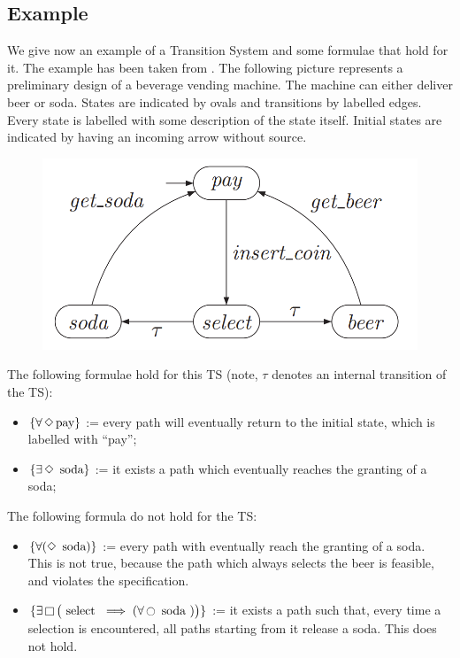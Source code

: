 \documentclass{article}
\begin{document}
\subsection{Example} \label{subsec:example}
We give now an example of a Transition System and some formulae that hold for it. The example has been taken from \cite[Paragraph 2.1]{BaKa}.
The following picture represents a preliminary design of a beverage vending machine. The machine can either deliver beer or soda. States are indicated by ovals and transitions by labelled edges. Every state is labelled with some description of the state itself. Initial states are indicated by having an incoming arrow without source.
\begin{figure}[H]
  \begin{center}
      \includegraphics[scale = 0.50]{pictures/example.png}
  \end{center}
\end{figure}
The following formulae hold for this TS (note, $\tau$ denotes an internal transition of the TS):
\begin{itemize}
    \item $\{ \forall \mathop{\Diamond}  \text{pay} \}$ := every path will eventually return to the initial state, which is labelled with ``pay'';
    \item $\{ \exists \mathop{\Diamond} \text{ soda} \}$ := it exists a path which eventually reaches the granting of a soda;
\end{itemize}
The following formula do not hold for the TS:
\begin{itemize}
    \item $\{ \forall (\mathop{\Diamond} \text{ soda}) \}$ := every path with eventually reach the granting of a soda. This is not true, because the path which always selects the beer is feasible, and violates the specification.
    \item $\{ \exists \mathop{\square} \big(\text{ select } \implies  (\forall \mathop{\ocircle} \text{ soda })\big) \}$ := it exists a path such that, every time a selection is encountered, all paths starting from it release a soda. 
            This does not hold.
\end{itemize}
\end{document}
